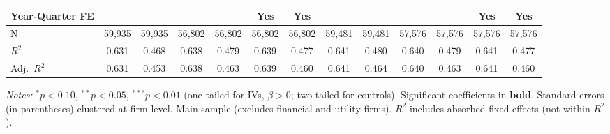 \begin{landscape}
\begin{table}[H]
\begin{tabular}{lcccccccccccc}
Year-Quarter FE &  &  &  &  & Yes & Yes &  &  &  &  & Yes & Yes \\
\midrule
N & 59,935 & 59,935 & 56,802 & 56,802 & 56,802 & 56,802 & 59,481 & 59,481 & 57,576 & 57,576 & 57,576 & 57,576 \\
$R^2$ & 0.631 & 0.468 & 0.638 & 0.479 & 0.639 & 0.477 & 0.641 & 0.480 & 0.640 & 0.479 & 0.641 & 0.477 \\
Adj.~$R^2$ & 0.631 & 0.453 & 0.638 & 0.463 & 0.639 & 0.460 & 0.641 & 0.464 & 0.640 & 0.463 & 0.641 & 0.460 \\
\bottomrule
\end{tabular}
\begin{minipage}{\linewidth}
\vspace{2pt}\scriptsize
\textit{Notes:} $^{*}p<0.10$, $^{**}p<0.05$, $^{***}p<0.01$ (one-tailed for IVs, $\beta > 0$; two-tailed for controls).
 Significant coefficients in \textbf{bold}.
 Standard errors (in parentheses) clustered at firm level.
 Main sample (excludes financial and utility firms).
 $R^2$ includes absorbed fixed effects (not within-$R^2$).
\end{minipage}
\end{table}
\end{landscape}